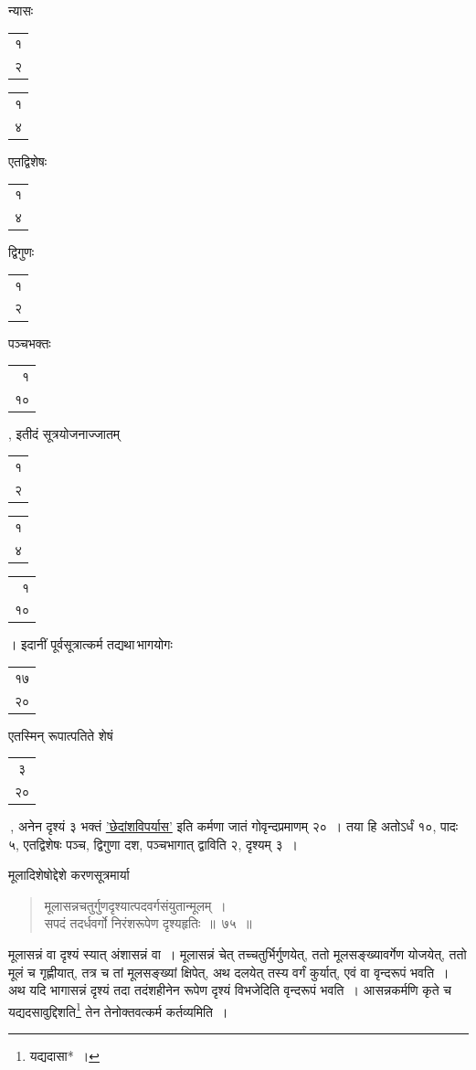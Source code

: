 \documentclass[10pt, openany]{book}
\begin{document}
{{न्यासः\textendash \begin{tabular}{r|}१\\ २\end{tabular}\begin{tabular}{r}१ \\ ४\end{tabular}एतद्विशेषः\begin{tabular}{r}१\\ ४\end{tabular}द्विगुणः\begin{tabular}{r}१\\ २\end{tabular}पञ्चभक्तः\begin{tabular}{r}१\\ १०\end{tabular}, इतीदं सूत्रयोजनाज्जातम्\begin{tabular}{r|}१ \\२\end{tabular} \begin{tabular}{r|}१ \\४\end{tabular}\begin{tabular}{r}१ \\१०\end{tabular}। इदानीं पूर्वसूत्रात्कर्म तद्यथा\textendash \,भागयोगः \begin{tabular}{|c|}१७\\ २०\\\hline \end{tabular} एतस्मिन्
रूपात्पतिते शेषं \begin{tabular}{|c|} ३\\ २०\\\hline \end{tabular}\,, {अनेन दृश्यं ३ भक्तं \hyperref[33]{'छेदांशविपर्यास'} इति कर्मणा जातं गोवृन्दप्रमाणम् २०~। तया हि अतोऽर्धं}
{१०, पादः ५, एतद्विशेषः पञ्च, द्विगुणा दश, पञ्चभागात् द्वाविति २,
दृश्यम् ३~।}
\vspace{3mm}

{मूलादिशेषोद्देशे करणसूत्रमार्या\textemdash}

\begin{quote}
    
{\bs मूलासन्नचतुर्गुणदृश्यात्पदवर्गसंयुतान्मूलम्~। \\
 सपदं तदर्धवर्गो निरंशरूपेण दृश्यहृतिः~॥~७५~॥}\end{quote}

{मूलासन्नं वा दृश्यं स्यात् अंशासन्नं वा~। मूलासन्नं चेत्
तच्चतुर्भिर्गुणयेत्, ततो मूलसङ्ख्यावर्गेण योजयेत्, ततो मूलं च गृह्णीयात्, तत्र च तां मूलसङ्ख्यां
क्षिपेत्, अथ दलयेत् तस्य}
{वर्गं कुर्यात्, एवं वा वृन्दरूपं भवति~। अथ यदि भागासन्नं दृश्यं तदा
तदंशहीनेन रूपेण दृश्यं}
{विभजेदिति वृन्दरूपं भवति~। आसन्नकर्मणि कृते च यद्यदसावुद्दिशति\renewcommand{\thefootnote}{\s २}\footnote{\s यद्यदासा*~।} तेन
तेनोक्तवत्कर्म}
{कर्तव्यमिति~।}

}}
\end{document}
